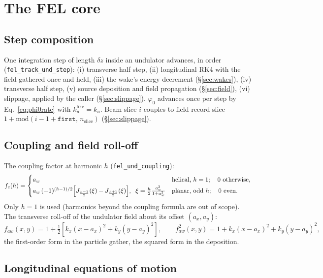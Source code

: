 \documentclass[11pt]{article}
\newcommand{\code}[1]{\texttt{#1}}
\begin{document}
\section{The FEL core}\label{sec:core}

\subsection{Step composition}\label{sec:step}

One integration step of length $\delta z$ inside an undulator advances, in order
(\code{fel\_track\_und\_step}): (i) transverse half step, (ii) longitudinal RK4 with
the field gathered once and held, (iii) the wake's energy decrement
(\S\ref{sec:wakes}), (iv) transverse half step, (v) source deposition and field
propagation (\S\ref{sec:field}), (vi) slippage, applied by the caller
(\S\ref{sec:slippage}). $\varphi_0$ advances once per step by Eq.~\ref{eq:phi0rate}
with $k_u^{\mathrm{like}} = k_u$. Beam slice $i$ couples to field record slice
$1 + \mathrm{mod}(i-1+\code{first},\, n_{\mathrm{slice}})$ (\S\ref{sec:slippage}).

\subsection{Coupling and field roll-off}\label{sec:coupling}

The coupling factor at harmonic $h$ (\code{fel\_und\_coupling}):
\begin{equation}\label{eq:fc}
  f_c(h) = \begin{cases}
    a_w & \text{helical, } h=1; \quad 0 \text{ otherwise},\\[2pt]
    a_w\,(-1)^{(h-1)/2}\Bigl[J_{\frac{h-1}{2}}(\xi) - J_{\frac{h+1}{2}}(\xi)\Bigr],
    \;\; \xi = \frac{h}{2}\frac{a_w^2}{1+a_w^2} & \text{planar, odd } h;\quad 0 \text{ even.}
  \end{cases}
\end{equation}
Only $h=1$ is used (harmonics beyond the coupling formula are out of scope). The
transverse roll-off of the undulator field about its offset $(a_x, a_y)$:
\begin{equation}\label{eq:faw}
  f_{aw}(x,y) = 1 + \tfrac12\!\left[k_x (x-a_x)^2 + k_y (y-a_y)^2\right], \qquad
  f_{aw}^2(x,y) = 1 + k_x (x-a_x)^2 + k_y (y-a_y)^2 ,
\end{equation}
the first-order form in the particle gather, the squared form in the deposition.

\subsection{Longitudinal equations of motion}\label{sec:eom}
\end{document}

